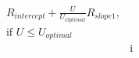 \documentclass[preview]{standalone}
\begin{document}
\begin{align*}
R_{intercept} +  \frac{U}{U_{Optimal}} R_{slope1}, &\\[6pt] \text{if }  U \leq U_{optimal}  \\[6pt] & \text{i}
\end{align*}
\end{document}
